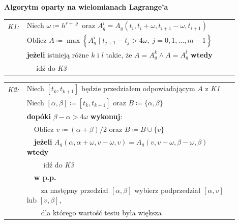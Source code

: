 \documentclass[oik, pdftex, man]{mgrwms}
\begin{document}
    \vspace{10pt}
    \begin{table}[H]
        \begin{center}
            \textbf{Algorytm oparty na wielomianach Lagrange'a}            
        \end{center}

        \begin{tabular}{p{0.045\linewidth} p{0.85\linewidth}}
            \textit{K1:}    & Niech $\omega \coloneqq h^{r+\varrho}$ oraz $A_{g}^{i} = A_{g}\left(t_{i}, t_{i}+\omega, t_{i+1}-\omega, t_{i+1}\right)$ \\
                            & Oblicz $A\coloneqq\max \left\{A_{g}^{i} \mid t_{j+1}-t_{j}>4 \omega,\; j=0,1, \ldots, m-1 \right\}$ \\
                            & \textbf{jeżeli} istnieją różne $k$ i $l$ takie, że $A = A_{g}^{k} \land A = A_{g}^{l}$ \textbf{wtedy} \\
                            & $\quad$ idź do \textit{K3} \\
        \end{tabular}
    \end{table} \vspace{-20pt}
    \begin{table}[H]
        \begin{tabular}{p{0.045\linewidth} p{0.85\linewidth}}
        \textit{K2:}    & Niech $[t_{k}, t_{k+1}]$ będzie przedziałem odpowiadającym $A$ z \textit{K1} \\
                        & Niech $[\alpha,\beta] \coloneqq [t_{k}, t_{k+1}]$ oraz $B \coloneqq \{\alpha, \beta\}$ \\
                        & \textbf{dopóki} $\beta - \alpha > 4\omega$ \textbf{wykonuj}: \\
                        & $\quad$Oblicz $v \coloneqq (\alpha + \beta) / 2$ oraz $B \coloneqq B \cup \{v\}$ \\
                        & $\quad$\textbf{jeżeli} $A_{g}(\alpha, \alpha + \omega, v - \omega, v) = A_{g}(v, v + \omega, \beta - \omega, \beta)$ \textbf{wtedy} \\
                        & $\quad$$\quad$ idź do \textit{K3} \\
                        & $\quad$\textbf{w p.p.} \\
                        & $\quad$$\quad$za następny przedział $[\alpha, \beta]$ wybierz podprzedział $[\alpha, v]$ lub $[v, \beta]$, \\
                        & $\quad$$\quad$dla którego wartość testu była większa \\
        \end{tabular}
    \end{table} \vspace{-20pt}
\end{document}
